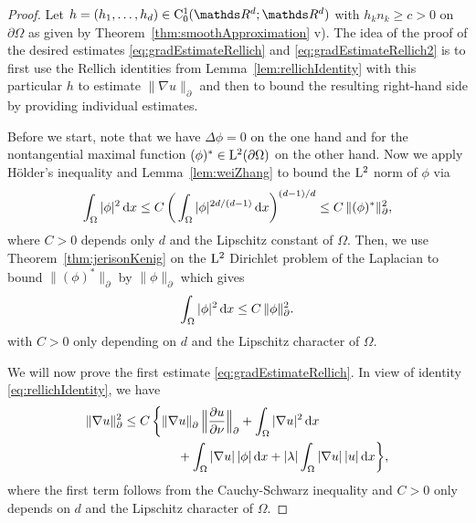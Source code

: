 \begin{proof}
  Let $h = (h_1, \dots, h_d) \in \CC_0^1(\R^d; \R^d)$ with $h_k n_k \geq c > 0$ on $\partial \Omega$ as given by Theorem~\ref{thm:smoothApproximation} v). 
  The idea of the proof of the desired estimates \eqref{eq:gradEstimateRellich} and \eqref{eq:gradEstimateRellich2} is to first use the Rellich identities from Lemma~\ref{lem:rellichIdentity} with this particular $h$ to estimate $\|\nabla u\|^{}_\partial$ and then to bound the resulting right-hand side by providing individual estimates.

  Before we start, note that we have $\Delta \phi = 0$ on the one hand and for the nontangential maximal function $(\phi)^* \in \mathrm{L}^2(\partial\Omega)$ on the other hand. 
  Now we apply Hölder's inequality and Lemma~\ref{lem:weiZhang} to bound the $\mathrm{L}^2$ norm of $\phi$ via
  \begin{align*}
    \int_\Omega |\phi|^2 \, {\operatorname{d}\!{x}} 
    \leq C\, \bigg( \int_\Omega |\phi|^{2d/(d - 1)} \, {\operatorname{d}\!{x}} \bigg)^{(d - 1)/d}
    \leq C\, \|(\phi)^* \|_\partial^2,
  \end{align*}
  where $C > 0$ depends only $d$ and the Lipschitz constant of $\Omega$.
  Then, we use Theorem~\ref{thm:jerisonKenig} on the $\mathrm{L}^2$ Dirichlet problem of the Laplacian to bound $\|(\phi)^*\|_\partial$ by $\|\phi\|_\partial$ which gives
  \begin{align}
    \label{eq:dahlbergEstimate}
    \int_\Omega |\phi|^2 \, {\operatorname{d}\!{x}} \leq C\, \|\phi\|_\partial^2.
  \end{align}
  with $C > 0$ only depending on $d$ and the Lipschitz character of $\Omega$.

  We will now prove the first estimate \eqref{eq:gradEstimateRellich}.
  In view of identity \eqref{eq:rellichIdentity}, we have
  \begin{align}
    \label{eq:normRellich}
    \begin{alignedat}{1}
    \|\nabla u\|_\partial^2
      &\leq C \, \bigg\{ \|\nabla u\|^{}_\partial \, \Big\| \frac{\partial u}{\partial \nu} \Big\|^{}_\partial + \int_\Omega |\nabla u|^2 \, {\operatorname{d}\!{x}} \\
    &\hspace{1.5cm}+ \int_\Omega |\nabla u| \, |\phi| \, {\operatorname{d}\!{x}} + |\lambda| \int_\Omega |\nabla u|\, |u| \, {\operatorname{d}\!{x}} \bigg\},
    \end{alignedat}
  \end{align}
  where the first term follows from the Cauchy-Schwarz inequality and $C > 0$ only depends on $d$ and the Lipschitz character of $\Omega$.


\end{proof}
